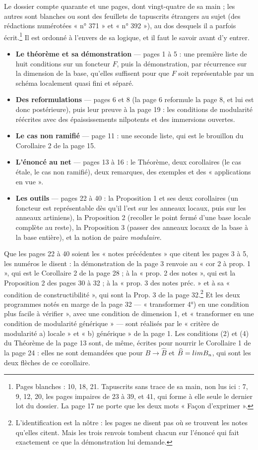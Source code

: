 \documentclass[11pt,a4paper]{article}
\begin{document}
Le dossier compte quarante et une pages, dont vingt-quatre de sa main ; les
autres sont blanches ou sont des feuillets de tapuscrits étrangers au sujet
(des rédactions numérotées « n° 371 » et « n° 392 »), au dos desquels il a
parfois écrit.\footnote{Pages blanches : 10, 18, 21. Tapuscrits sans trace de
sa main, non lus ici : 7, 9, 12, 20, les pages impaires de 23 à 39, et 41, qui
forme à elle seule le dernier lot du dossier. La page 17 ne porte que les deux
mots « Façon d'exprimer ».} Il est ordonné à l'envers de sa logique, et il faut
le savoir avant d'y entrer.

\begin{itemize}
\item \textbf{Le théorème et sa démonstration} — pages 1 à 5 : une première
liste de huit conditions sur un foncteur $F$, puis la démonstration, par
récurrence sur la dimension de la base, qu'elles suffisent pour que $F$ soit
représentable par un schéma localement quasi fini et séparé.
\item \textbf{Des reformulations} — pages 6 et 8 (la page 6 reformule la
page 8, et lui est donc postérieure), puis leur preuve à la page 19 : les
conditions de modularité réécrites avec des épaississements nilpotents et des
immersions ouvertes.
\item \textbf{Le cas non ramifié} — page 11 : une seconde liste, qui est le
brouillon du Corollaire 2 de la page 15.
\item \textbf{L'énoncé au net} — pages 13 à 16 : le Théorème, deux
corollaires (le cas étale, le cas non ramifié), deux remarques, des exemples
et des « applications en vue ».
\item \textbf{Les outils} — pages 22 à 40 : la Proposition 1 et ses deux
corollaires (un foncteur est représentable dès qu'il l'est sur les anneaux
locaux, puis sur les anneaux artiniens), la Proposition 2 (recoller le point
fermé d'une base locale complète au reste), la Proposition 3 (passer des
anneaux locaux de la base à la base entière), et la notion de paire
\emph{modulaire}.
\end{itemize}

Que les pages 22 à 40 soient les « notes précédentes » que citent les pages 3
à 5, les numéros le disent : la démonstration de la page 3 renvoie au
« cor 2 à prop. 1 », qui est le Corollaire 2 de la page 28 ; à la « prop. 2
des notes », qui est la Proposition 2 des pages 30 à 32 ; à la « prop. 3 des
notes préc. » et à sa « condition de constructibilité », qui sont la Prop. 3
de la page 32.\footnote{L'identification est la nôtre : les pages ne disent
pas où se trouvent les notes qu'elles citent. Mais les trois renvois tombent
chacun sur l'énoncé qui fait exactement ce que la démonstration lui demande.}
Et les deux programmes notés en marge de la page 32 — « transformer 4°) en une
condition plus facile à vérifier », avec une condition de dimension 1, et
« transformer en une condition de modularité générique » — sont réalisés par
le « critère de modularité a) locale » et « b) générique » de la page 1. Les
conditions (2) et (4) du Théorème de la page 13 sont, de même, écrites pour
nourrir le Corollaire 1 de la page 24 : elles ne sont demandées que pour
$B \to \widehat{B}$ et $\widehat{B} = \varprojlim B_n$, qui sont les deux
flèches de ce corollaire.
\end{document}
